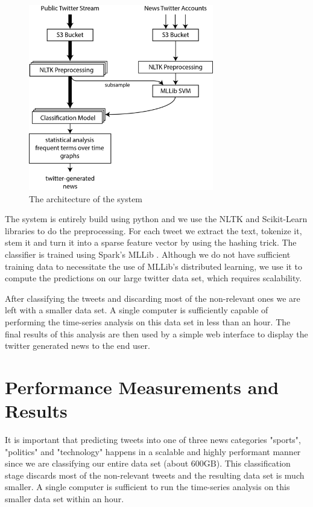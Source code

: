 \documentclass{llncs}
\begin{document}
\begin{figure}
	\centering
	\includegraphics[width=0.72\textwidth]{images/system_arch_2.png} 
	\caption{The architecture of the system}
	\label{fig:architecture}
\end{figure}

The system is entirely build using python and we use the NLTK \cite{nltk} and Scikit-Learn \cite{scikit-learn} libraries to do the preprocessing. For each tweet we extract the text, tokenize it, stem it and turn it into a sparse feature vector by using the hashing trick. The classifier is trained using Spark's MLLib \cite{mllib}. Although we do not have sufficient training data to necessitate the use of MLLib's distributed learning, we use it to compute the predictions on our large twitter data set, which requires scalability.

After classifying the tweets and discarding most of the non-relevant ones we are left with a smaller data set. A single computer is sufficiently capable of performing the time-series analysis on this data set in less than an hour. The final results of this analysis are then used by a simple web interface to display the twitter generated news to the end user.

\section{Performance Measurements and Results}
It is important that predicting tweets into one of three news categories "sports", "politics" and "technology" happens in a scalable and highly performant manner since we are classifying our entire data set (about $600\text{GB}$). This classification stage discards most of the non-relevant tweets and the resulting data set is much smaller. A single computer is sufficient to run the time-series analysis on this smaller data set within an hour.
\end{document}
